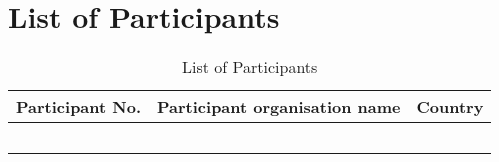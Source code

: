 \chapter{List of Participants}

\begin{longtable}[H]{l p{9cm} p{2cm}}
	
	\toprule[2pt]
	
	\textbf{Participant No.} & \textbf{Participant organisation name} & \textbf{Country} \\
	
	\midrule[1.5pt] 
	\endhead
	
	 &  & \vspace{0.2cm} \\
	
	\midrule

	 &  & \vspace{0.2cm} \\
	
	\midrule
	
	 &  & \vspace{0.2cm} \\

	\midrule

 	&  & \vspace{0.2cm} \\
	
	\bottomrule[2pt]
	
	\caption{List of Participants}
	\label{Participants}
\end{longtable}

